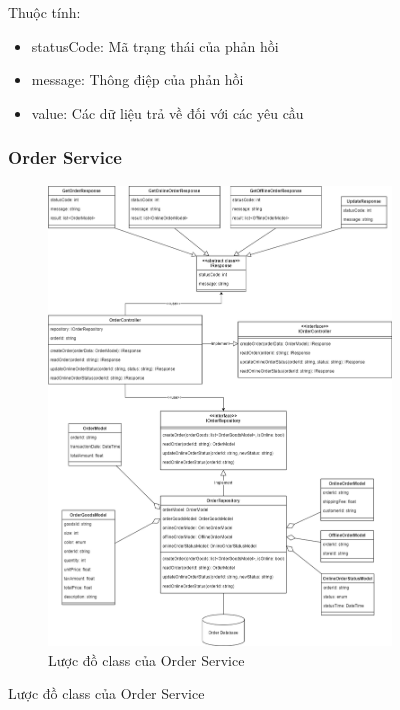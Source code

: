 \begin{figure}[!htp]
	Thuộc tính:
	\begin{itemize}
		\item statusCode: Mã trạng thái của phản hồi
		\item message: Thông điệp của phản hồi
		\item value: Các dữ liệu trả về đối với các yêu cầu
	\end{itemize}

\subsubsection{Order Service}
\begin{figure}[!htp]
	\centering
	\includegraphics[width=11cm]{img/Architecture/service/OrderService.png}
	\newline
	\caption{Lược đồ class của Order Service}
\end{figure}




\end{figure}
